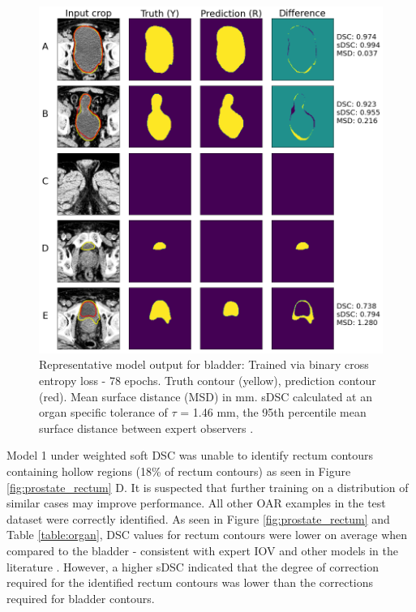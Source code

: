 \begin{figure}[H]
	\begin{center}
		\includegraphics[width=1.0\textwidth]{figures/prostate_BCE_bladder}
		\caption{Representative model output for bladder: Trained via binary cross entropy loss - 78 epochs. Truth contour (yellow), prediction contour (red). Mean surface distance (MSD) in mm. sDSC \cite{Nikolov_2018} calculated at an organ specific tolerance of $\tau$ = 1.46 mm, the 95th percentile mean surface distance between expert observers \cite{Roach_2019}.}
		\label{fig:prostate_BCE_bladder}
	\end{center}
\end{figure}

Model 1 under weighted soft DSC was unable to identify rectum contours containing hollow regions (18\% of rectum contours) as seen in Figure \ref{fig:prostate_rectum} D. It is suspected that further training on a distribution of similar cases may improve performance. All other OAR examples in the test dataset were correctly identified. As seen in Figure \ref{fig:prostate_rectum} and Table \ref{table:organ}, DSC values for rectum contours were lower on average when compared to the bladder - consistent with expert IOV \cite{Roach_2019} and other models in the literature \cite{Liu_2020, Kazemifar_2018, Wong2020}. However, a higher sDSC indicated that the degree of correction required for the identified rectum contours was lower than the corrections required for bladder contours.



